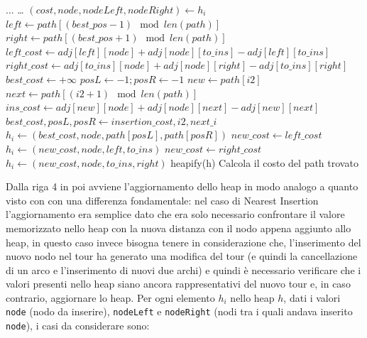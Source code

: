\documentclass[a4paper,12pt]{report}
\begin{document}
\begin{tcolorbox}[colframe=black, colback=white, boxrule=0.5pt, title=Cheapest Insertion Versione 2, coltitle=black, fonttitle=\bfseries, colbacktitle=white, breakable]
  \begin{algorithmic}[1]
    \State ...
      \State \dots
        \State $(cost, node, nodeLeft, nodeRight) \gets h_i$
        \State $left \gets path[(best\_pos - 1) \mod len(path)]$
        \State $right \gets path[(best\_pos + 1) \mod len(path)]$
        \State $left\_cost \gets adj[left][node] + adj[node][to\_ins] - adj[left][to\_ins]$
        \State $right\_cost \gets adj[to\_ins][node] + adj[node][right] - adj[to\_ins][right]$
          \State $best\_cost \gets +\infty$
          \State $posL \gets -1; posR \gets -1$
            \State $new \gets path[i2]$
            \State $next \gets path[(i2 + 1) \mod len(path)]$
            \State $ins\_cost \gets adj[new][node] + adj[node][next] - adj[new][next]$
              \State $best\_cost, posL, posR \gets insertion\_cost, i2, next\_i$
            \EndIf
          \EndFor
          \State $h_i \gets (best\_cost, node, path[posL], path[posR])$
        \EndIf
          \State $new\_cost \gets left\_cost$
          \State $h_i \gets (new\_cost, node, left, to\_ins)$
        \EndIf
          \State $new\_cost \gets right\_cost$
          \State $h_i \gets (new\_cost, node, to\_ins, right)$
        \EndIf
      \EndFor
      \State heapify(h)
    \EndWhile
    \State Calcola il costo del path trovato
  \end{algorithmic}
\end{tcolorbox}
Dalla riga 4 in poi avviene l'aggiornamento dello heap in modo analogo a quanto visto con  con una differenza fondamentale: nel caso di Nearest Insertion l'aggiornamento era semplice dato che era solo necessario confrontare il valore memorizzato nello heap con la nuova distanza con il nodo appena aggiunto allo heap, in questo caso invece bisogna tenere in considerazione che, l'inserimento del nuovo nodo nel tour ha generato una modifica del tour (e quindi la cancellazione di un arco e l'inserimento di nuovi due archi) e quindi è necessario verificare che i valori presenti nello heap siano ancora rappresentativi del nuovo tour e, in caso contrario, aggiornare lo heap. Per ogni elemento $h_i$ nello heap $h$, dati i valori \lstinline!node! (nodo da inserire), \lstinline!nodeLeft! e \lstinline!nodeRight! (nodi tra i quali andava inserito \lstinline!node!), i casi da considerare sono:
\end{document}
